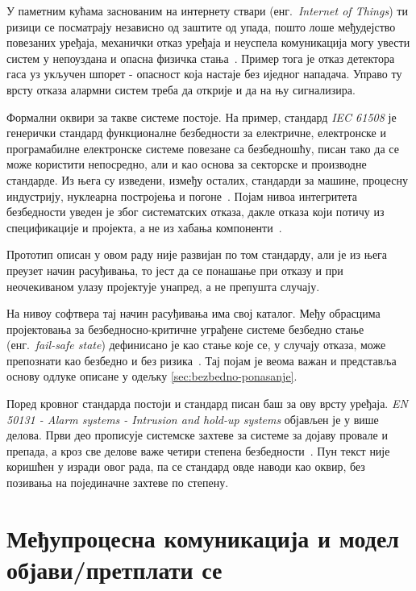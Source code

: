 \documentclass[12pt,oneside]{memoir}
\begin{document}
У паметним кућама заснованим на интернету ствари (енг.\ \textit{Internet of Things}) ти
ризици се посматрају независно од заштите од упада, пошто лоше међудејство повезаних уређаја, механички отказ
уређаја и неуспела комуникација могу увести систем у непоуздана и опасна физичка
стања~\cite{AlWahah2024}. Пример тога је отказ детектора гаса уз укључен шпорет -
опасност која настаје без иједног нападача. Управо ту врсту отказа алармни систем треба да
открије и да на њу сигнализира.

Формални оквири за такве системе постоје. На пример, стандард \emph{IEC 61508} је генерички стандард
функционалне безбедности за електричне, електронске и програмабилне електронске системе
повезане са безбедношћу, писан тако да се може користити непосредно, али и као основа за
секторске и производне стандарде. Из њега су изведени, између осталих, стандарди за машине,
процесну индустрију, нуклеарна постројења и погоне~\cite{IEC61508Overview}. Појам нивоа
интегритета безбедности уведен је због систематских отказа, дакле отказа који потичу из
специфи\-кације и пројекта, а не из хабања компоненти~\cite{IEC61508Overview}.

Прототип описан у овом раду није развијан по том стандарду, али је из њега преузет начин
расуђивања, то јест да се понашање при отказу и при неочекиваном улазу пројектује унапред,
а не препушта случају.

На нивоу софтвера тај начин расуђивања има свој каталог. Међу обрасцима пројектовања за
безбедносно-критичне уграђене системе безбедно стање (енг.\ \textit{fail-safe state})
дефинисано је као стање које се, у случају отказа, може препознати као безбедно и без
ризика~\cite{Armoush2010}. Тај појам је веома важан и представља основу одлуке описане у
одељку \ref{sec:bezbedno-ponasanje}.

Поред кровног стандарда постоји и стандард писан баш за ову врсту уређаја.
\emph{EN 50131 - Alarm systems - Intrusion and hold-up systems} објављен је у више делова.
Први део прописује системске захтеве за системе за дојаву провале и препада, а кроз све
делове важе четири степена безбедности~\cite{EN50131}. Пун текст није коришћен у изради овог
рада, па се стандард овде наводи као оквир, без позивања на појединачне захтеве по
степену.

\section{Међупроцесна комуникација и модел објави/претплати се}
\label{sec:ipc}
\end{document}
